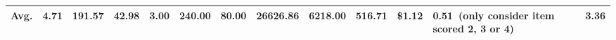 \begin{table}
\begin{tabular}{lccccccccccp{2.5cm}c}
\hline
\rowcolor[gray]{.9} 
Avg. & 4.71 & 191.57 & 42.98 & 3.00 & 240.00 & 80.00 & 26626.86 & 6218.00 & 516.71 & \$1.12 & 0.51~(only consider item scored 2, 3 or 4) & 3.36 \\ 
\hline

\hline

\hline

\hline
\end{tabular}
\end{table}
